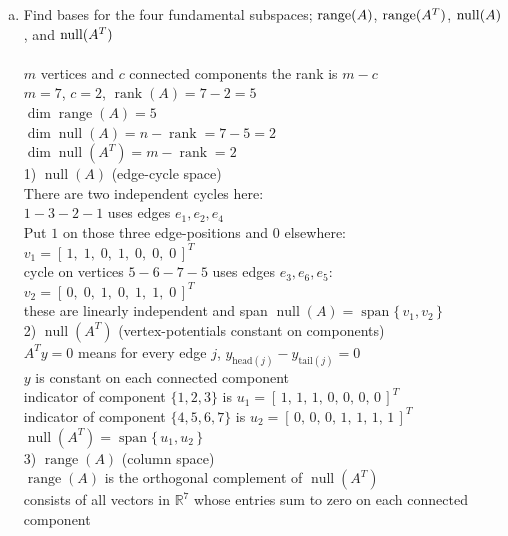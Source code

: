 \documentclass{article}
\begin{document}
{{\begin{enumerate}
\begin{enumerate}[a.]
\begin{verbatim}
   4
   ^
   |
  e7
   |
   7 --> 5
   ^     |
  e6     v
   6 <-- 
    \___e3
\end{verbatim}
\newpage\item Find bases for the four fundamental subspaces; ${\rm range}(A)$, ${\rm range}(A^T)$, ${\rm null}(A)$, and ${\rm null}(A^T)$
\\
\\$m$ vertices and $c$ connected components the rank is $m-c$
\\$m=7$, $c=2$, $\operatorname{rank}(A)=7-2=5$
\\$\dim\operatorname{range}(A)=5$
\\$\dim\operatorname{null}(A)=n-\operatorname{rank}=7-5=2$
\\$\dim\operatorname{null}(A^T)=m-\operatorname{rank}=2$
\\1) $\displaystyle \operatorname{null}(A)$ (edge-cycle space)
\\There are two independent cycles here:
\\$1\!-\!3\!-\!2\!-\!1$ uses edges $e_1,e_2,e_4$
\\Put $1$ on those three edge-positions and $0$ elsewhere:
\\$v_1 = [\,1,\;1,\;0,\;1,\;0,\;0,\;0\,]^T$
\\cycle on vertices $5\!-\!6\!-\!7\!-\!5$ uses edges $e_3,e_6,e_5$:
\\$v_2 = [\,0,\;0,\;1,\;0,\;1,\;1,\;0\,]^T$
\\these are linearly independent and span $\operatorname{null}(A)=\operatorname{span}\{\,v_1,v_2\,\}$
\\2) $\operatorname{null}(A^T)$ (vertex-potentials constant on components)
\\$A^T y=0$ means for every edge $j$, $y_{\text{head}(j)}-y_{\text{tail}(j)}=0$
\\$y$ is constant on each connected component
\\indicator of component $\{1,2,3\}$ is $u_1 = [\,1,\,1,\,1,\,0,\,0,\,0,\,0\,]^T$
\\indicator of component $\{4,5,6,7\}$ is $u_2 = [\,0,\,0,\,0,\,1,\,1,\,1,\,1\,]^T$
\\$\operatorname{null}(A^T)=\operatorname{span}\{\,u_1,u_2\,\}$
\\3) $\displaystyle \operatorname{range}(A)$ (column space)
\\$\operatorname{range}(A)$ is the orthogonal complement of $\operatorname{null}(A^T)$
\\consists of all vectors in $\mathbb R^7$ whose entries sum to zero on each connected component

\end{enumerate}
\end{enumerate}}}
\end{document}
